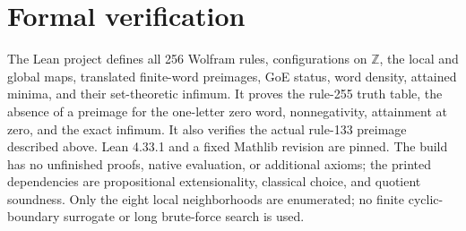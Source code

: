 \documentclass[10pt]{article}
\begin{document}
\section*{Formal verification}
The Lean project defines all 256 Wolfram rules, configurations on
$\mathbb Z$, the local and global maps, translated finite-word preimages,
GoE status, word density, attained minima, and their set-theoretic infimum.
It proves the rule-255 truth table, the absence of a preimage for the
one-letter zero word, nonnegativity, attainment at zero, and the exact
infimum. It also verifies the actual rule-133 preimage described above.
Lean 4.33.1 and a fixed Mathlib revision are pinned. The build has no
unfinished proofs, native evaluation, or additional axioms; the printed
dependencies are propositional extensionality, classical choice, and
quotient soundness. Only the eight local neighborhoods are enumerated;
no finite cyclic-boundary surrogate or long brute-force search is used.
\end{document}
